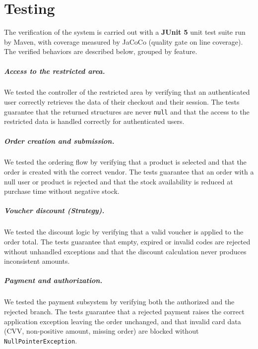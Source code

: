 \chapter{Testing}
\label{cap:testing}

The verification of the system is carried out with a \textbf{JUnit 5} unit
test suite run by Maven, with coverage measured by JaCoCo (quality gate on
line coverage). The verified behaviors are described below, grouped by feature.

\paragraph{Access to the restricted area.} We tested the controller of the
restricted area by verifying that an authenticated user correctly retrieves
the data of their checkout and their session. The tests guarantee that the
returned structures are never \texttt{null} and that the access to the
restricted data is handled correctly for authenticated users.

\paragraph{Order creation and submission.} We tested the ordering flow by
verifying that a product is selected and that the order is created with the
correct vendor. The tests guarantee that an order with a null user or product
is rejected and that the stock availability is reduced at purchase time
without negative stock.

\paragraph{Voucher discount (Strategy).} We tested the discount logic by
verifying that a valid voucher is applied to the order total. The tests
guarantee that empty, expired or invalid codes are rejected without
unhandled exceptions and that the discount calculation never produces
inconsistent amounts.

\paragraph{Payment and authorization.} We tested the payment subsystem by
verifying both the authorized and the rejected branch. The tests guarantee
that a rejected payment raises the correct application exception leaving the
order unchanged, and that invalid card data (CVV, non-positive amount,
missing order) are blocked without \texttt{NullPointerException}.

